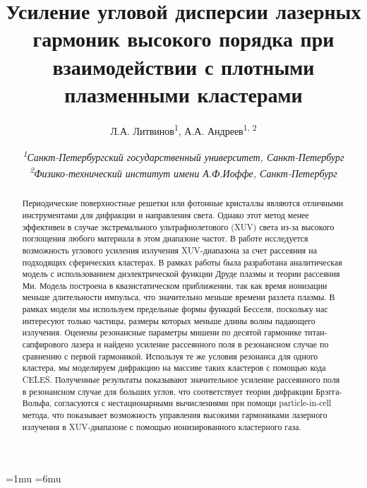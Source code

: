 \documentclass[10pt]{article}
\begin{document}



	\pagestyle{fancy}
	\fancyhf{}
	\fancyhead[L]{\textit{\nouppercase{\leftmark}}}
	\fancyfoot[C]{\thepage}

	\thinmuskip=1mu
	\thickmuskip=6mu
	\def\stacktype{S}\Sstackgap=-4.3pt
	\captionsetup[subfigure]{margin=0.05\textwidth}


	\newcommand{\subfigureautorefname}{\figureautorefname}
	\renewcommand{\thesubfigure}{\asbuk{subfigure}}


	\title{Усиление угловой дисперсии лазерных гармоник высокого порядка при взаимодействии с плотными плазменными кластерами}
	\author{
		Л.А. Литвинов\textsuperscript{1}, А.А. Андреев\textsuperscript{1, 2}
	}
	\date{
		\normalsize{\textit{\textsuperscript{1}Санкт-Петербургский государственный университет, Санкт-Петербург \\ \textsuperscript{2}Физико-технический институт имени А.Ф.Иоффе, Санкт-Петербург}}
	}
	\maketitle

	\begin{abstract}
		Периодические поверхностные решетки или фотонные кристаллы являются отличными инструментами для дифракции и направления света. Однако этот метод менее эффективен в случае экстремального ультрафиолетового (XUV) света из-за высокого поглощения любого материала в этом диапазоне частот. В работе исследуется возможность углового усиления излучения XUV-диапазона за счет рассеяния на подходящих сферических кластерах. В рамках работы была разработана аналитическая модель с использованием диэлектрической функции Друде плазмы и теории рассеяния Ми. Модель построена в квазистатическом приближении, так как время ионизации меньше длительности импульса, что значительно меньше времени разлета плазмы. В рамках модели мы используем предельные формы функций Бесселя, поскольку нас интересуют только частицы, размеры которых меньше длины волны падающего излучения. Оценены резонансные параметры мишени по десятой гармонике титан-сапфирового лазера и найдено усиление рассеянного поля в резонансном случае по сравнению с первой гармоникой. Используя те же условия резонанса для одного кластера, мы моделируем дифракцию на массиве таких кластеров с помощью кода CELES. Полученные результаты показывают значительное усиление рассеянного поля в резонансном случае для больших углов, что соответствует теории дифракции Брэгга-Вольфа, согласуются с нестационарными вычислениями при помощи particle-in-cell метода, что показывает возможность управления высокими гармониками лазерного излучения в XUV-диапазоне с помощью ионизированного кластерного газа.
	\end{abstract}
\end{document}
